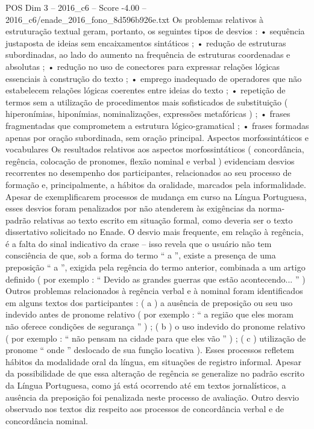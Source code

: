 \begin{textsample}{POS Dim 3 – 2016\_c6 – Score -4.00 – 2016\_c6/enade\_2016\_fono\_8d596b926e.txt}
Os problemas relativos à estruturação textual geram, portanto, os seguintes tipos de desvios : • sequência justaposta de ideias sem encaixamentos sintáticos ; • redução de estruturas subordinadas, ao lado do aumento na frequência de estruturas coordenadas e absolutas ; • redução no uso de conectores para expressar relações lógicas essenciais à construção do texto ; • emprego inadequado de operadores que não estabelecem relações lógicas coerentes entre ideias do texto ; • repetição de termos sem a utilização de procedimentos mais sofisticados de substituição ( hiperonímias, hiponímias, nominalizações, expressões metafóricas ) ; • frases fragmentadas que comprometem a estrutura lógico-gramatical ; • frases formadas apenas por oração subordinada, sem oração principal.
Aspectos morfossintáticos e vocabulares Os resultados relativos aos aspectos morfossintáticos ( concordância, regência, colocação de pronomes, flexão nominal e verbal ) evidenciam desvios recorrentes no desempenho dos participantes, relacionados ao seu processo de formação e, principalmente, a hábitos da oralidade, marcados pela informalidade.
Apesar de exemplificarem processos de mudança em curso na Língua Portuguesa, esses desvios foram penalizados por não atenderem às exigências da norma-padrão relativas ao texto escrito em situação formal, como deveria ser o texto dissertativo solicitado no Enade.
O desvio mais frequente, em relação à regência, é a falta do sinal indicativo da crase – isso revela que o usuário não tem consciência de que, sob a forma do termo “ a ”, existe a presença de uma preposição “ a ”, exigida pela regência do termo anterior, combinada a um artigo definido ( por exemplo : “ Devido as grandes guerras que estão acontecendo... ” ) Outros problemas relacionados à regência verbal e à nominal foram identificados em alguns textos dos participantes : ( a ) a ausência de preposição ou seu uso indevido antes de pronome relativo ( por exemplo : “ a região que eles moram não oferece condições de segurança ” ) ; ( b ) o uso indevido do pronome relativo ( por exemplo : “ não pensam na cidade para que eles vão ” ) ; ( c ) utilização de pronome “ onde ” deslocado de sua função locativa ).
Esses processos refletem hábitos da modalidade oral da língua, em situações de registro informal.
Apesar da possibilidade de que essa alteração de regência se generalize no padrão escrito da Língua Portuguesa, como já está ocorrendo até em textos jornalísticos, a ausência da preposição foi penalizada neste processo de avaliação.
Outro desvio observado nos textos diz respeito aos processos de concordância verbal e de concordância nominal.

\end{textsample}
